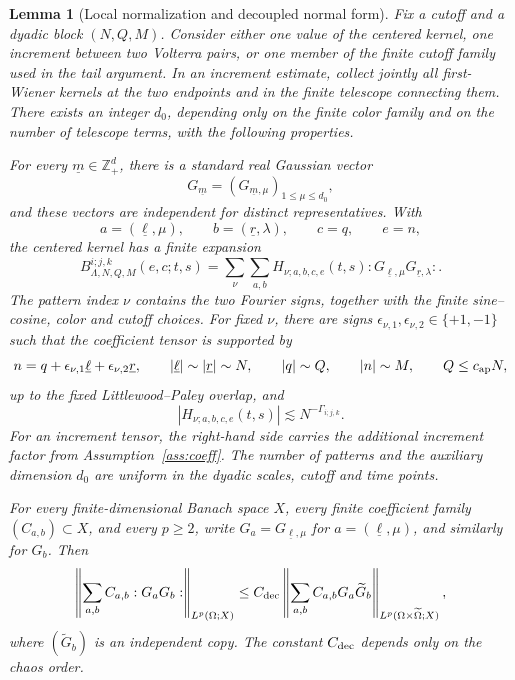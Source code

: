 \documentclass[11pt,reqno]{amsart}
\numberwithin{equation}{section}
\theoremstyle{plain}
\newtheorem{lemma}[theorem]{Lemma}
\theoremstyle{definition}
\newcommand{\Z}{\mathbb Z}
\newcommand{\wick}[1]{:#1:}
\begin{document}
\begin{lemma}[Local normalization and decoupled normal form]\label{lem:local-normal-form}
Fix a cutoff and a dyadic block \((N,Q,M)\).  Consider either one value of the
centered kernel, one increment between two Volterra pairs, or one member of
the finite cutoff family used in the tail argument.  In an increment
estimate, collect jointly all first-Wiener kernels at the two endpoints and
in the finite telescope connecting them.  There exists an integer \(d_0\),
depending only on the finite color family and on the number of telescope
terms, with the following properties.

For every \(\underline m\in\Z^d_+\), there is a standard real Gaussian vector
\[
        G_{\underline m}
        =(G_{\underline m,\mu})_{1\le\mu\le d_0},
\]
and these vectors are independent for distinct representatives.  With
\[
        a=(\underline\ell,\mu),\qquad
        b=(\underline r,\lambda),\qquad c=q,\qquad e=n,
\]
the centered kernel has a finite expansion
\begin{equation}\label{eq:centered-normal-form}
        B_{\Lambda,N,Q,M}^{i;j,k}(e,c;t,s)
        =\sum_{\nu}\sum_{a,b}
        H_{\nu;a,b,c,e}(t,s)
        \wick{G_{\underline\ell,\mu}G_{\underline r,\lambda}} .
\end{equation}
The pattern index \(\nu\) contains the two Fourier signs, together with the
finite sine--cosine, color and cutoff choices.  For fixed \(\nu\), there are
signs \(\epsilon_{\nu,1},\epsilon_{\nu,2}\in\{+1,-1\}\) such that the
coefficient tensor is supported by
\begin{equation}\label{eq:H-support}
        n=q+\epsilon_{\nu,1}\underline\ell
              +\epsilon_{\nu,2}\underline r,
        \qquad |\underline\ell|\sim|\underline r|\sim N,
        \qquad |q|\sim Q,
        \qquad |n|\sim M,
        \qquad Q\le c_{\rm ap}N,
\end{equation}
up to the fixed Littlewood--Paley overlap, and
\begin{equation}\label{eq:H-size}
        |H_{\nu;a,b,c,e}(t,s)|
        \lesssim N^{-\Gamma_{i;j,k}}.
\end{equation}
For an increment tensor, the right-hand side carries the additional
increment factor from Assumption~\ref{ass:coeff}.  The number of patterns
and the auxiliary dimension \(d_0\) are uniform in the dyadic scales,
cutoff and time points.

For every finite-dimensional Banach space \(X\), every finite coefficient
family \((C_{a,b})\subset X\), and every \(p\ge2\), write
\(G_a=G_{\underline\ell,\mu}\) for \(a=(\underline\ell,\mu)\),
and similarly for \(G_b\).  Then
\begin{equation}\label{eq:local-decoupling}
        \left\|\sum_{a,b}C_{a,b}\wick{G_aG_b}
        \right\|_{L^p(\Omega;X)}
        \le C_{\rm dec}
        \left\|\sum_{a,b}C_{a,b}G_a\widetilde G_b
        \right\|_{L^p(\Omega\times\widetilde\Omega;X)},
\end{equation}
where \((\widetilde G_b)\) is an independent copy.  The constant
\(C_{\rm dec}\) depends only on the chaos order.
\end{lemma}
\end{document}
